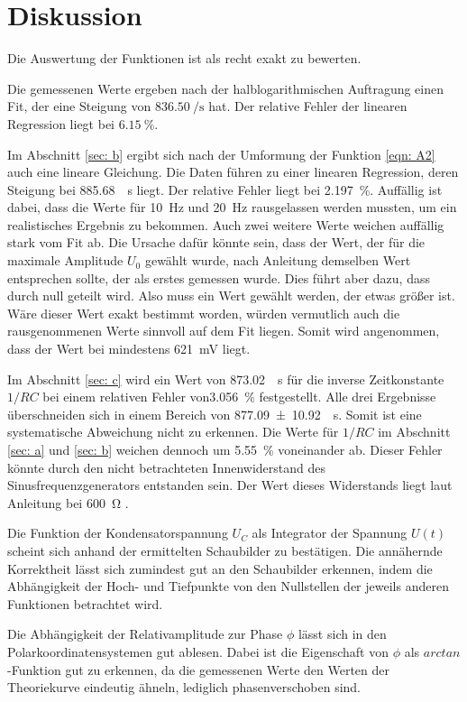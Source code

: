 \section{Diskussion}
\label{sec: dis}

Die Auswertung der Funktionen ist als recht exakt zu bewerten. 

\noindent Die gemessenen Werte ergeben nach der halblogarithmischen Auftragung einen Fit, der eine Steigung von 
$\SI[per-mode=fraction]{836.50}{\per\second}$ hat. Der relative Fehler der linearen Regression liegt bei $\SI{6.15}{\percent}$. 

\noindent Im Abschnitt \ref{sec: b} ergibt sich nach der Umformung der Funktion \eqref{eqn: A2}  auch eine lineare Gleichung.
Die Daten führen zu einer linearen Regression, deren Steigung bei \SI[per-mode=fraction]{885.68}{\per\second} liegt. Der relative
Fehler liegt bei \SI{2.197}{\percent}. Auffällig ist dabei, dass die Werte für \SI{10}{\hertz} und \SI{20}{\hertz} rausgelassen werden mussten,
um ein realistisches Ergebnis zu bekommen. Auch zwei weitere Werte weichen auffällig stark vom Fit ab. Die Ursache dafür könnte sein,
dass der Wert, der für die maximale Amplitude $U_0$ gewählt wurde, nach Anleitung demselben Wert entsprechen sollte, der als erstes gemessen wurde. Dies führt aber dazu, dass durch null geteilt wird. Also muss ein Wert gewählt werden, der etwas größer ist. Wäre dieser Wert exakt bestimmt worden, würden vermutlich auch die rausgenommenen Werte sinnvoll auf dem Fit liegen. 
Somit wird angenommen, dass der Wert bei mindestens \SI{621}{\milli\volt} liegt. 

\noindent Im Abschnitt \ref{sec: c} wird ein Wert von \SI[per-mode=fraction]{873.02}{\per\second} für die inverse Zeitkonstante $1/RC$ bei einem relativen
Fehler von\SI{3.056}{\percent} festgestellt.
Alle drei Ergebnisse überschneiden sich in einem Bereich von
\SI[per-mode=fraction]{877.09 \pm 10.92}{\per\second}. Somit ist eine systematische Abweichung nicht zu erkennen.
Die Werte für $1/RC$ im Abschnitt \ref{sec: a} und \ref{sec: b} weichen dennoch um \SI{5.55}{\percent} voneinander ab. Dieser Fehler könnte durch den nicht
betrachteten Innenwiderstand des Sinusfrequenzgenerators entstanden sein. Der Wert dieses Widerstands liegt laut Anleitung bei
\SI{600}{\ohm} \cite{versuch}. 

\noindent Die Funktion der Kondensatorspannung $U_{C}$ als Integrator der Spannung $U(t)$ scheint sich anhand der ermittelten
Schaubilder zu bestätigen. Die annähernde Korrektheit lässt sich zumindest gut an den Schaubilder erkennen,
indem die Abhängigkeit der Hoch- und Tiefpunkte von den Nullstellen der jeweils anderen Funktionen betrachtet wird. 

\noindent Die Abhängigkeit der Relativamplitude zur Phase $\phi$ lässt sich in den Polarkoordinatensystemen gut ablesen.
Dabei ist die Eigenschaft von $\phi$ als $arctan$-Funktion gut zu erkennen, da die gemessenen Werte den Werten der Theoriekurve
eindeutig ähneln, lediglich phasenverschoben sind. 
